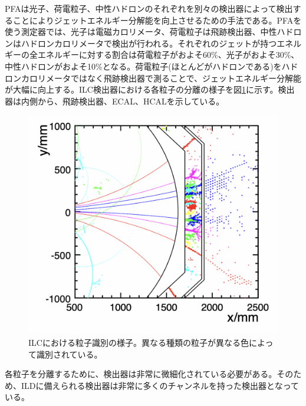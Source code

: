 PFAは光子、荷電粒子、中性ハドロンのそれぞれを別々の検出器によって検出することによりジェットエネルギー分解能を向上させるための手法である。PFAを使う測定器では、光子は電磁カロリメータ、荷電粒子は飛跡検出器、中性ハドロンはハドロンカロリメータで検出が行われる。それぞれのジェットが持つエネルギーの全エネルギーに対する割合は荷電粒子がおよそ60\%、光子がおよそ30\%、中性ハドロンがおよそ10\%となる。荷電粒子(ほとんどがハドロンである)をハドロンカロリメータではなく飛跡検出器で測ることで、ジェットエネルギー分解能が大幅に向上する。ILC検出器における各粒子の分離の様子を図\ref{PFA_ILC}に示す。検出器は内側から、飛跡検出器、ECAL、HCALを示している。
\begin{figure}[H]
	\begin{center}
		\includegraphics[width=370pt]{./Figure/EcalDetector/PFA_ILC.png}
		\caption[ILCにおける粒子識別の様子]{ILCにおける粒子識別の様子。異なる種類の粒子が異なる色によって識別されている。}
		\label{PFA_ILC}
	\end{center}
\end{figure}



各粒子を分離するために、検出器は非常に微細化されている必要がある。そのため、ILDに備えられる検出器は非常に多くのチャンネルを持った検出器となっている。

